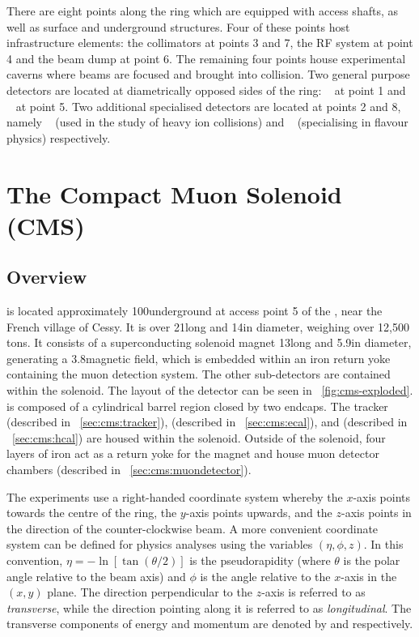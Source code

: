 There are eight points along the \LHC ring which are equipped with access shafts, as well as surface and underground structures. Four of these points host \LHC infrastructure elements: the collimators at points 3 and 7, the RF system at point 4 and the beam dump at point 6. The remaining four points house experimental caverns where beams are focused and brought into collision. Two general purpose detectors are located at diametrically opposed sides of the ring: \ATLAS~\cite{AtlasatLHC} at point 1 and \CMS~\cite{CMSatLHC} at point 5. Two additional specialised detectors are located at points 2 and 8, namely \ALICE~\cite{AliceatLHC} (used in the study of heavy ion collisions) and \LHCb~\cite{LHCbatLHC} (specialising in flavour physics) respectively. 



\section{The Compact Muon Solenoid (CMS)}
\label{sec:cms}

\subsection{Overview}
\label{sec:cms:overview}

\CMS is located approximately 100\m underground at access point 5 of the \LHC, near the French village of Cessy. It is over 21\m long and 14\m in diameter, weighing over 12,500 tons. It consists of a superconducting solenoid magnet 13\m long and 5.9\m in diameter, generating a 3.8\T magnetic field, which is embedded within an iron return yoke containing the muon detection system. The other sub-detectors are contained within the solenoid. The layout of the \CMS detector can be seen in \Fig~\ref{fig:cms-exploded}. \CMS is composed of a cylindrical barrel region closed by two endcaps. The tracker (described in \Sec~\ref{sec:cms:tracker}), \ECAL (described in \Sec~\ref{sec:cms:ecal}), and \HCAL (described in \Sec~\ref{sec:cms:hcal}) are housed within the solenoid. Outside of the solenoid, four layers of iron act as a return yoke for the magnet and house muon detector chambers (described in \Sec~\ref{sec:cms:muondetector}). 

The \LHC experiments use a right-handed coordinate system whereby the $x$-axis points towards the centre of the \LHC ring, the $y$-axis points upwards, and the $z$-axis points in the direction of the counter-clockwise beam. A more convenient coordinate system can be defined for physics analyses using the variables $(\eta,\phi,z)$. In this convention, $\eta = -\ln [ \tan(\theta/2)]$ is the pseudorapidity (where $\theta$ is the polar angle relative to the beam axis) and $\phi$ is the angle relative to the $x$-axis in the $(x,y)$ plane. The direction perpendicular to the $z$-axis is referred to as \emph{transverse}, while the direction pointing along it is referred to as \emph{longitudinal}. The transverse components of energy and momentum are denoted by \ET and \pT respectively. 

